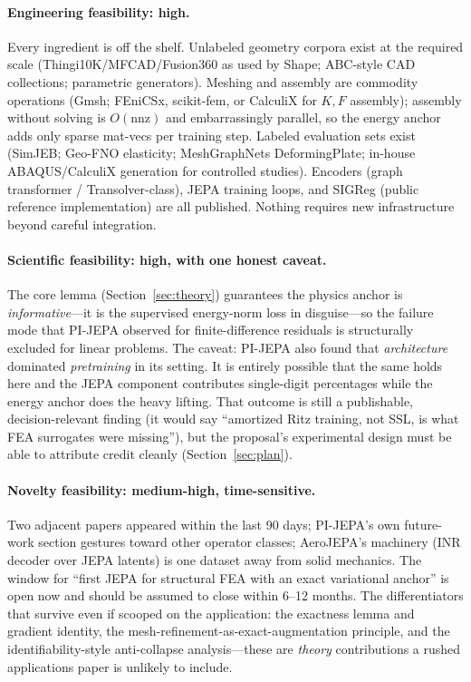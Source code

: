 \documentclass[11pt]{article}
\begin{document}
\paragraph{Engineering feasibility: high.}
Every ingredient is off the shelf. Unlabeled geometry corpora exist at the
required scale (Thingi10K/MFCAD/Fusion360 as used by Shape; ABC-style CAD
collections; parametric generators). Meshing and assembly are commodity
operations (Gmsh; FEniCSx, scikit-fem, or CalculiX for $K,F$ assembly);
assembly without solving is $O(\text{nnz})$ and embarrassingly parallel, so
the energy anchor adds only sparse mat-vecs per training step. Labeled
evaluation sets exist (SimJEB; Geo-FNO elasticity; MeshGraphNets
DeformingPlate; in-house ABAQUS/CalculiX generation for controlled studies).
Encoders (graph transformer / Transolver-class), JEPA training loops, and
SIGReg (public reference implementation) are all published. Nothing requires
new infrastructure beyond careful integration.

\paragraph{Scientific feasibility: high, with one honest caveat.}
The core lemma (Section~\ref{sec:theory}) guarantees the physics anchor is
\emph{informative}---it is the supervised energy-norm loss in disguise---so
the failure mode that PI-JEPA observed for finite-difference residuals is
structurally excluded for linear problems. The caveat: PI-JEPA also found
that \emph{architecture} dominated \emph{pretraining} in its setting. It is
entirely possible that the same holds here and the JEPA component contributes
single-digit percentages while the energy anchor does the heavy lifting. That
outcome is still a publishable, decision-relevant finding (it would say
``amortized Ritz training, not SSL, is what FEA surrogates were missing''),
but the proposal's experimental design must be able to attribute credit
cleanly (Section~\ref{sec:plan}).

\paragraph{Novelty feasibility: medium-high, time-sensitive.}
Two adjacent papers appeared within the last 90 days; PI-JEPA's own
future-work section gestures toward other operator classes; AeroJEPA's
machinery (INR decoder over JEPA latents) is one dataset away from solid
mechanics. The window for ``first JEPA for structural FEA with an exact
variational anchor'' is open now and should be assumed to close within
6--12 months. The differentiators that survive even if scooped on the
application: the exactness lemma and gradient identity, the
mesh-refinement-as-exact-augmentation principle, and the
identifiability-style anti-collapse analysis---these are \emph{theory}
contributions a rushed applications paper is unlikely to include.
\end{document}
